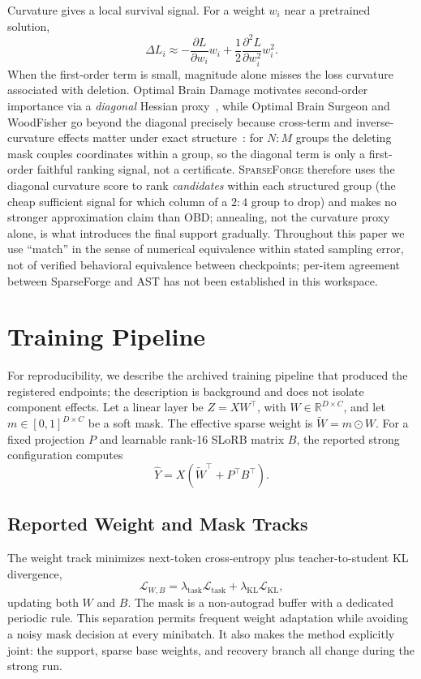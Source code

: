 \documentclass{article}
\newcommand{\method}{\textsc{SparseForge}}
\begin{document}
Curvature gives a local survival signal. For a weight $w_i$ near a pretrained solution,
\begin{equation}
\Delta L_i \approx -\frac{\partial L}{\partial w_i}w_i + \frac{1}{2}\frac{\partial^2 L}{\partial w_i^2}w_i^2.
\end{equation}
When the first-order term is small, magnitude alone misses the loss curvature associated with deletion. Optimal Brain Damage motivates second-order importance via a \emph{diagonal} Hessian proxy~\citep{lecun1990obd}, while Optimal Brain Surgeon and WoodFisher go beyond the diagonal precisely because cross-term and inverse-curvature effects matter under exact structure~\citep{hassibi1993obs,singh2020woodfisher}: for $N{:}M$ groups the deleting mask couples coordinates within a group, so the diagonal term is only a first-order faithful ranking signal, not a certificate. \method{} therefore uses the diagonal curvature score to rank \emph{candidates} within each structured group (the cheap sufficient signal for which column of a $2{:}4$ group to drop) and makes no stronger approximation claim than OBD; annealing, not the curvature proxy alone, is what introduces the final support gradually. Throughout this paper we use ``match'' in the sense of numerical equivalence within stated sampling error, not of verified behavioral equivalence between checkpoints; per-item agreement between SparseForge and AST has not been established in this workspace.

\section{Training Pipeline}\label{sec:method}
For reproducibility, we describe the archived training pipeline that produced the registered endpoints; the description is background and does not isolate component effects. Let a linear layer be $Z=XW^\top$, with $W\in\mathbb{R}^{D\times C}$, and let $m\in[0,1]^{D\times C}$ be a soft mask. The effective sparse weight is $\widetilde W=m\odot W$. For a fixed projection $P$ and learnable rank-16 SLoRB matrix $B$, the reported strong configuration computes
\begin{equation}
\widehat Y=X(\widetilde W^\top+P^\top B^\top).
\end{equation}

\subsection{Reported Weight and Mask Tracks}
The weight track minimizes next-token cross-entropy plus teacher-to-student KL divergence,
\begin{equation}
\mathcal{L}_{W,B}=\lambda_{\mathrm{task}}\mathcal{L}_{\mathrm{task}}+\lambda_{\mathrm{KL}}\mathcal{L}_{\mathrm{KL}},
\end{equation}
updating both $W$ and $B$. The mask is a non-autograd buffer with a dedicated periodic rule. This separation permits frequent weight adaptation while avoiding a noisy mask decision at every minibatch. It also makes the method explicitly joint: the support, sparse base weights, and recovery branch all change during the strong run.
\end{document}
